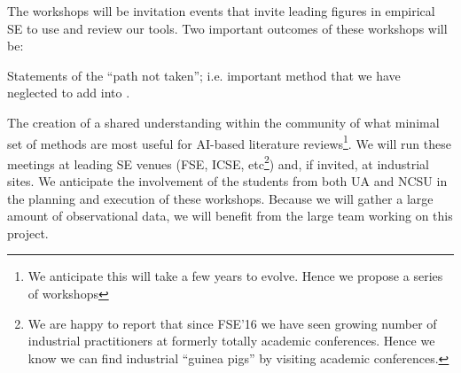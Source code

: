 The workshops will be invitation events that invite leading figures in empirical SE to use and review our tools. 
Two important outcomes
of these workshops will be:
\bi
\item
Statements of  the ``path not taken''; i.e. 
 important method that we have neglected to add into {\IT}.
\item
The creation of a shared understanding within the community
of what minimal set of methods are most useful for AI-based literature
reviews\footnote{We anticipate this will take a few years to evolve.
Hence we propose a series of workshops}.
\ei
We will run these meetings  at leading SE venues (FSE, ICSE, etc\footnote{We are happy to report
that  since FSE'16 we have seen  growing number of industrial practitioners at formerly totally academic conferences. Hence we know we can find industrial ``guinea pigs'' by
visiting academic conferences.}) and, if invited, at industrial sites.
We anticipate the involvement of the students from both UA and NCSU in the planning and execution of these workshops.
Because we will gather a large amount of observational data, we will benefit from the large team working on this project.
\vspace{8pt}

